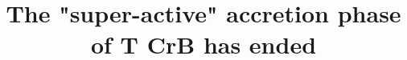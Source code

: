 \documentclass{aastex631}
\begin{document}
\title{The "super-active" accretion phase of T CrB has ended}


\end{document}
